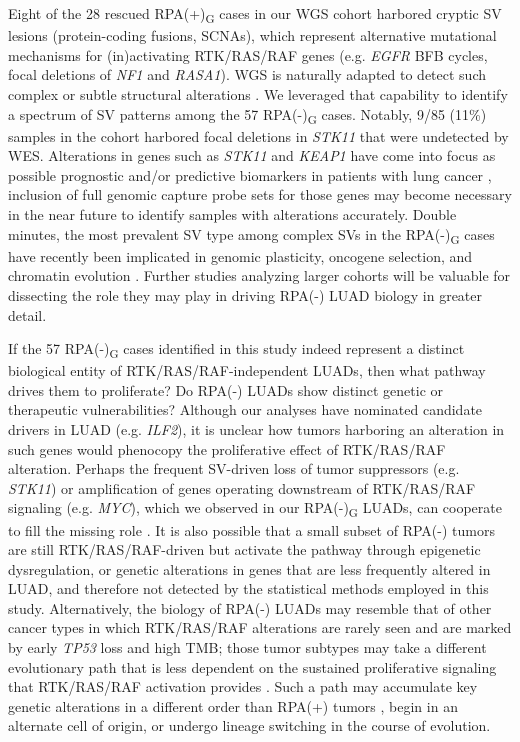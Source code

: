 \documentclass[phd,tocprelim]{cornell}
\begin{document}
Eight of the 28 rescued RPA(+)\textsubscript{G} cases in our WGS cohort harbored cryptic SV lesions (protein-coding fusions, SCNAs), which represent alternative mutational mechanisms for (in)activating RTK/RAS/RAF genes (e.g. \textit{EGFR} BFB cycles, focal deletions of \textit{NF1} and \textit{RASA1}). WGS is naturally adapted to detect such complex or subtle structural alterations \cite{Hadi2020-um}. We leveraged that capability to identify a spectrum of SV patterns among the 57 RPA(-)\textsubscript{G} cases. Notably, 9/85 (11\%) samples in the cohort harbored focal deletions in \textit{STK11} that were undetected by WES. Alterations in genes such as \textit{STK11} and \textit{KEAP1} have come into focus as possible prognostic and/or predictive biomarkers in patients with lung cancer \cite{Arbour2018-qg,Skoulidis2018-be}, inclusion of full genomic capture probe sets for those genes may become necessary in the near future to identify samples with alterations accurately. Double minutes, the most prevalent SV type among complex SVs in the RPA(-)\textsubscript{G} cases have recently been implicated in genomic plasticity, oncogene selection, and chromatin evolution \cite{Verhaak2019}. Further studies analyzing larger cohorts will be valuable for dissecting the role they may play in driving RPA(-) LUAD biology in greater detail.

If the 57 RPA(-)\textsubscript{G} cases identified in this study indeed represent a distinct biological entity of RTK/RAS/RAF-independent LUADs, then what pathway drives them to proliferate? Do RPA(-) LUADs show distinct genetic or therapeutic vulnerabilities? Although our analyses have nominated candidate drivers in LUAD (e.g. \textit{ILF2}), it is unclear how tumors harboring an alteration in such genes would phenocopy the proliferative effect of RTK/RAS/RAF alteration. Perhaps the frequent SV-driven loss of tumor suppressors (e.g. \textit{STK11}) or amplification of genes operating downstream of RTK/RAS/RAF signaling (e.g. \textit{MYC}), which we observed in our RPA(-)\textsubscript{G} LUADs, can cooperate to fill the missing role \cite{Sears2000-ua}. It is also possible that a small subset of RPA(-) tumors are still RTK/RAS/RAF-driven but activate the pathway through epigenetic dysregulation, or genetic alterations in genes that are less frequently altered in LUAD, and therefore not detected by the statistical methods employed in this study. Alternatively, the biology of RPA(-) LUADs may resemble that of other cancer types in which RTK/RAS/RAF alterations are rarely seen and are marked by early \textit{TP53} loss and high TMB; those tumor subtypes may take a different evolutionary path that is less dependent on the sustained proliferative signaling that RTK/RAS/RAF activation provides \cite{Chen2019-bi,Drosten2014-el,Salgueiro2020-xg}. Such a path may accumulate key genetic alterations in a different order than RPA(+) tumors \cite{Lee2019-nm}, begin in an alternate cell of origin, or undergo lineage switching in the course of evolution.
\end{document}
